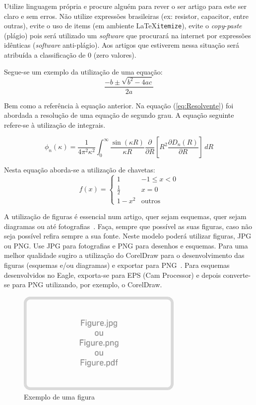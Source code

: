 \documentclass[journal, twoside, a4paper]{IEEEtran_LEEC_v1}
\begin{document}
Utilize linguagem própria e procure alguém para rever o ser artigo para este ser claro e sem erros. Não utilize expressões brasileiras (ex: resistor, capacitor, entre outras), evite o uso de items (em  ambiente \LaTeX \texttt{itemize}), evite o \textit{copy}-\textit{paste} (plágio) pois será utilizado um \textit{software} que procurará na internet por expressões idênticas (\textit{software} anti-plágio). Aos artigos que estiverem nessa situação será atribuída a classificação de 0 (zero valores).

Segue-se um exemplo da utilização de uma equação:
\begin{equation}
	\frac{-b\pm\sqrt{b^2-4ac}}{2a}
	\label{eq:Resolvente}
\end{equation}

Bem como a referência à equação anterior. Na equação (\ref{eq:Resolvente}) foi abordada a resolução de uma equação de segundo grau. A equação seguinte refere-se à utilização de integrais.

\begin{equation}
\phi_n(\kappa) =
\frac{1}{4\pi^2\kappa^2} \int_0^\infty
\frac{\sin(\kappa R)}{\kappa R}
\frac{\partial}{\partial R}
\left[R^2\frac{\partial D_n(R)}{\partial R}\right]\,dR	
\label{eq:Integral}
\end{equation}

Nesta equação aborda-se a utilização de chavetas:
\begin{equation}
f(x) =
\begin{cases}
1 				& -1 \le x < 0 \\
\frac{1}{2} & x = 0 \\
1 - x^2 & \mbox{outros}
\end{cases}
\label{eq:Chavetas}
\end{equation}

A utilização de figuras é essencial num artigo, quer sejam esquemas, quer sejam diagramas ou até fotografias~\cite{Swa82}. Faça, sempre que possível as suas figuras, caso não seja possível refira sempre a sua fonte. Neste modelo poderá utilizar figuras, JPG ou PNG. Use JPG para fotografias e PNG para desenhos e esquemas. Para uma melhor qualidade sugiro a utilização do CorelDraw para o desenvolvimento das figuras (esquemas e/ou diagramas) e exportar para PNG~\cite{Ta}. Para esquemas desenvolvidos no Eagle, exporta-se para EPS (Cam Processor) e depois converte-se para PNG utilizando, por exemplo, o CorelDraw.

\begin{figure}[ht]
	\includegraphics[width=80mm]{Figure.jpg}
	\caption{Exemplo de uma figura}
	\label{fig:ExemploFigura}
\end{figure}
\end{document}
